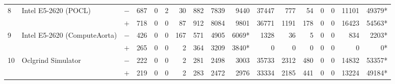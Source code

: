 \begin{tabular}{lll | rrrrrrr | rrrrrrr }
\hline
\multirow{ 2}{*}{8} & \multirow{ 2}{*}{Intel E5-2620 (POCL)} & $-$ & 687 & 0 & 2 & 30 & 882 & 7839 & 9440       & 37447 & 777 & 54 & 0 & 0 & 11101 & 49379* \\& & $+$ & 718 & 0 & 0 & 87 & 912 & 8084 & 9801 & 36771 & 1191 & 178 & 0 & 0 & 16423 & 54563* \\
\hline
\multirow{ 2}{*}{9} & \multirow{ 2}{*}{Intel E5-2620 (ComputeAorta)} & $-$ & 426 & 0 & 0 & 167 & 571 & 4905 & 6069*       & 1328 & 36 & 5 & 0 & 0 & 834 & 2203* \\& & $+$ & 265 & 0 & 0 & 2 & 364 & 3209 & 3840* & 0 & 0 & 0 & 0 & 0 & 0 & 0* \\
\hline
\multirow{ 2}{*}{10} & \multirow{ 2}{*}{Oclgrind Simulator} & $-$ & 222 & 0 & 0 & 2 & 281 & 2498 & 3003       & 35733 & 2312 & 480 & 0 & 0 & 14832 & 53357* \\& & $+$ & 219 & 0 & 0 & 2 & 283 & 2472 & 2976 & 33334 & 2185 & 441 & 0 & 0 & 13224 & 49184* \\
  \bottomrule
\end{tabular}

